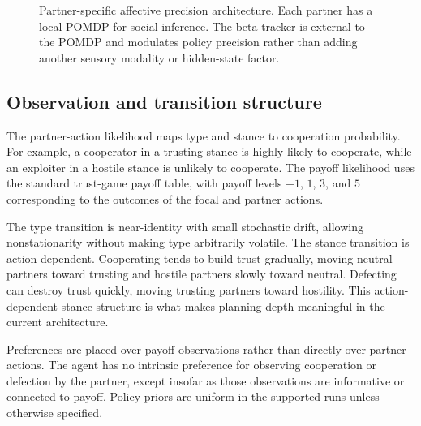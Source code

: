 \begin{figure}[t]
\centering
{}
\caption{Partner-specific affective precision architecture. Each partner has a local POMDP for social inference. The beta tracker is external to the POMDP and modulates policy precision rather than adding another sensory modality or hidden-state factor.}
\label{fig:model-schematic}
\end{figure}

\subsection{Observation and transition structure}

The partner-action likelihood maps type and stance to cooperation probability. For example, a cooperator in a trusting stance is highly likely to cooperate, while an exploiter in a hostile stance is unlikely to cooperate. The payoff likelihood uses the standard trust-game payoff table, with payoff levels $-1$, $1$, $3$, and $5$ corresponding to the outcomes of the focal and partner actions.

The type transition is near-identity with small stochastic drift, allowing nonstationarity without making type arbitrarily volatile. The stance transition is action dependent. Cooperating tends to build trust gradually, moving neutral partners toward trusting and hostile partners slowly toward neutral. Defecting can destroy trust quickly, moving trusting partners toward hostility. This action-dependent stance structure is what makes planning depth meaningful in the current architecture.

Preferences are placed over payoff observations rather than directly over partner actions. The agent has no intrinsic preference for observing cooperation or defection by the partner, except insofar as those observations are informative or connected to payoff. Policy priors are uniform in the supported runs unless otherwise specified.

